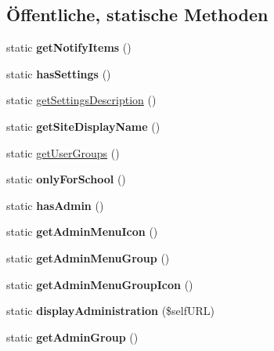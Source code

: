 \subsection*{Öffentliche, statische Methoden}
\begin{DoxyCompactItemize}
\item 
\mbox{\label{classschaukasten_ab786173ae943d21f9464b32725d78e02}} 
static {\bfseries get\+Notify\+Items} ()
\item 
\mbox{\label{classschaukasten_a6b908b047a901352bb4e9aebe4082e62}} 
static {\bfseries has\+Settings} ()
\item 
static \mbox{\hyperlink{classschaukasten_acfd3dc8596ffc07738a3b514420aaf0d}{get\+Settings\+Description}} ()
\item 
\mbox{\label{classschaukasten_a918e67b2f326be5f07815a121de9026e}} 
static {\bfseries get\+Site\+Display\+Name} ()
\item 
static \mbox{\hyperlink{classschaukasten_a0f69b600bdd4202443e2a770ad85f48c}{get\+User\+Groups}} ()
\item 
\mbox{\label{classschaukasten_a8197822b4472866fb27e2665362cf3bb}} 
static {\bfseries only\+For\+School} ()
\item 
\mbox{\label{classschaukasten_ab48280a878cbe96aeac857abb43f1a6c}} 
static {\bfseries has\+Admin} ()
\item 
\mbox{\label{classschaukasten_a3538831f4081337e8174f37592e324ea}} 
static {\bfseries get\+Admin\+Menu\+Icon} ()
\item 
\mbox{\label{classschaukasten_ae7e412413759b1fe4c834af543d3416f}} 
static {\bfseries get\+Admin\+Menu\+Group} ()
\item 
\mbox{\label{classschaukasten_a3c87342e3dbe6736fa702be9dad5f153}} 
static {\bfseries get\+Admin\+Menu\+Group\+Icon} ()
\item 
\mbox{\label{classschaukasten_ae6cd309e97e73529bcea2bad1fe36d84}} 
static {\bfseries display\+Administration} (\$self\+U\+RL)
\item 
\mbox{\label{classschaukasten_af7755b089f507b3e354d308b1cfcb172}} 
static {\bfseries get\+Admin\+Group} ()
\end{DoxyCompactItemize}
